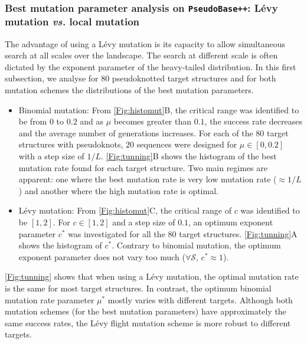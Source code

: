 \subsubsection{Best mutation parameter analysis on \texttt{PseudoBase++}: Lévy mutation \emph{vs.} local mutation}
The advantage of using a Lévy mutation is its capacity to allow simultaneous search at all scales over the landscape. The search at different scale is often dictated by the exponent parameter of the heavy-tailed distribution. In this first subsection, we analyse for $80$ pseudoknotted target structures and for both mutation schemes the distributions of the best mutation parameters.
\begin{itemize}
	\item Binomial mutation: From \autoref{Fig:histomut}B, the critical range was identified to be from $0$ to $0.2$ and as $\mu$ becomes greater than $0.1$, the success rate decreases and the average number of generations increases. For each of the $80$ target structures with pseudoknots, $20$ sequences were designed for $\mu \in [0,0.2]$ with a step size of $1/L$. \autoref{Fig:tunning}B shows the histogram of the best mutation rate found for each target structure. Two main regimes are apparent: one where the best mutation rate is very low mutation rate ($\approx 1/L$) and another where the high mutation rate is optimal.
	
	\item Lévy mutation: From \autoref{Fig:histomut}C, the critical range of $c$ was identified to be $[1,2]$. For $c \in [1,2]$ and a step size of $0.1$, an optimum exponent parameter $c^*$ was investigated for all the $80$ target structures. \autoref{Fig:tunning}A shows the histogram of $c^*$. Contrary to binomial mutation, the optimum exponent parameter does not vary too much ($\forall \mathcal{S}$, $c^*\approx 1$).
\end{itemize}
\autoref{Fig:tunning} shows that when using a Lévy mutation, the optimal mutation rate is the same for most target structures. In contrast, the optimum binomial mutation rate parameter $\mu^*$ mostly varies with different targets. Although both mutation schemes (for the best mutation parameters) have approximately the same success rates, the Lévy flight mutation scheme is more robust to different targets. %

